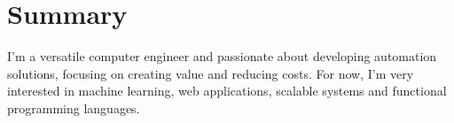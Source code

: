 \documentclass[letterpaper]{twentysecondcv} %
\begin{document}




        



\makeprofile %


\section{Summary}

I'm a versatile computer engineer and passionate about developing automation
solutions, focusing on creating value and reducing costs. For now, I'm very interested 
in machine learning, web applications, scalable systems and functional  programming
languages.
\end{document}
